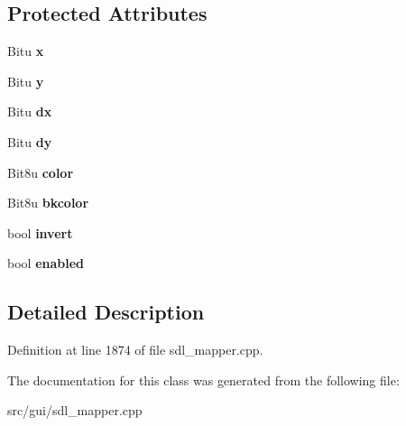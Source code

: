 \subsection*{Protected Attributes}
\begin{DoxyCompactItemize}
\item 
\hypertarget{classCButton_a31c9a5bc0e54382407372236ef0fce68}{Bitu {\bfseries x}}\label{classCButton_a31c9a5bc0e54382407372236ef0fce68}

\item 
\hypertarget{classCButton_a6be6467fc0eb283d33caa042c6c2bfbe}{Bitu {\bfseries y}}\label{classCButton_a6be6467fc0eb283d33caa042c6c2bfbe}

\item 
\hypertarget{classCButton_a0d46295304a83ce1a81fc42056ae3959}{Bitu {\bfseries dx}}\label{classCButton_a0d46295304a83ce1a81fc42056ae3959}

\item 
\hypertarget{classCButton_a6bb4df5cec766a3675bf3365927ff45f}{Bitu {\bfseries dy}}\label{classCButton_a6bb4df5cec766a3675bf3365927ff45f}

\item 
\hypertarget{classCButton_acf415cea0b3968f10393d204a0c4f4ec}{Bit8u {\bfseries color}}\label{classCButton_acf415cea0b3968f10393d204a0c4f4ec}

\item 
\hypertarget{classCButton_a34acf521fa23393acf3aa72b627489e6}{Bit8u {\bfseries bkcolor}}\label{classCButton_a34acf521fa23393acf3aa72b627489e6}

\item 
\hypertarget{classCButton_a8b3db5e11eaef4d5b539493abfcf0db9}{bool {\bfseries invert}}\label{classCButton_a8b3db5e11eaef4d5b539493abfcf0db9}

\item 
\hypertarget{classCButton_a4037c6c6e9cce44e38d21c4f87925193}{bool {\bfseries enabled}}\label{classCButton_a4037c6c6e9cce44e38d21c4f87925193}

\end{DoxyCompactItemize}


\subsection{Detailed Description}


Definition at line 1874 of file sdl\-\_\-mapper.\-cpp.



The documentation for this class was generated from the following file\-:\begin{DoxyCompactItemize}
\item 
src/gui/sdl\-\_\-mapper.\-cpp\end{DoxyCompactItemize}
